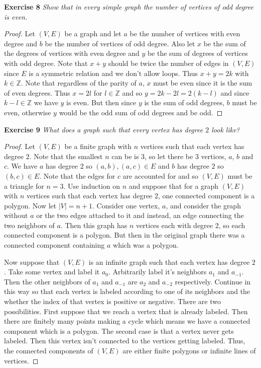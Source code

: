 \documentclass{article}
\begin{document}
\begin{flushleft}
\textbf{Exercise 8}
\textsl{Show that in every simple graph the number of vertices of odd degree is even.}
\begin{proof}
Let $(V,E)$ be a graph and let $a$ be the number of vertices with even degree and $b$ be the number of vertices of odd degree. Also let $x$ be the sum of the degrees of vertices with even degree and $y$ be the sum of degrees of vertices with odd degree. Note that $x+y$ should be twice the number of edges in $(V,E)$ since $E$ is a symmetric relation and we don't allow loops. Thus $x+y=2k$ with $k \in \mathbb{Z}$. Note that regardless of the parity of $a$, $x$ must be even since it is the sum of even degrees. Thus $x = 2l$ for $l \in \mathbb{Z}$ and so $y = 2k-2l = 2(k-l)$ and since $k-l \in \mathbb{Z}$ we have $y$ is even. But then since $y$ is the sum of odd degrees, $b$ must be even, otherwise $y$ would be the odd sum of odd degrees and be odd.
\end{proof}

\textbf{Exercise 9}
\textsl{What does a graph such that every vertex has degree $2$ look like?}
\begin{proof}
Let $(V,E)$ be a finite graph with $n$ vertices such that each vertex has degree $2$. Note that the smallest $n$ can be is $3$, so let there be $3$ vertices, $a$, $b$ and $c$. We have $a$ has degree $2$ so $(a,b), (a,c) \in E$ and $b$ has degree $2$ so $(b,c) \in E$. Note that the edges for $c$ are accounted for and so $(V,E)$ must be a triangle for $n=3$. Use induction on $n$ and suppose that for a graph $(V,E)$ with $n$ vertices such that each vertex has degree $2$, one connected component is a polygon. Now let $|V| = n+1$. Consider one vertex, $a$, and consider the graph without $a$ or the two edges attached to it and instead, an edge connecting the two neighbors of $a$. Then this graph has $n$ vertices each with degree $2$, so each connected component is a polygon. But then in the original graph there was a connected component containing $a$ which was a polygon.\newline

Now suppose that $(V,E)$ is an infinite graph such that each vertex has degree $2$. Take some vertex and label it $a_0$. Arbitrarily label it's neighbors $a_1$ and $a_{-1}$. Then the other neighbors of $a_1$ and $a_{-1}$ are $a_2$ and $a_{-2}$ respectively. Continue in this way so that each vertex is labeled according to one of its neighbors and the whether the index of that vertex is positive or negative. There are two possibilities. First suppose that we reach a vertex that is already labeled. Then there are finitely many points making a cycle which means we have a connected component which is a polygon. The second case is that a vertex never gets labeled. Then this vertex isn't connected to the vertices getting labeled. Thus, the connected components of $(V,E)$ are either finite polygons or infinite lines of vertices.
\end{proof}


\end{flushleft}
\end{document}
